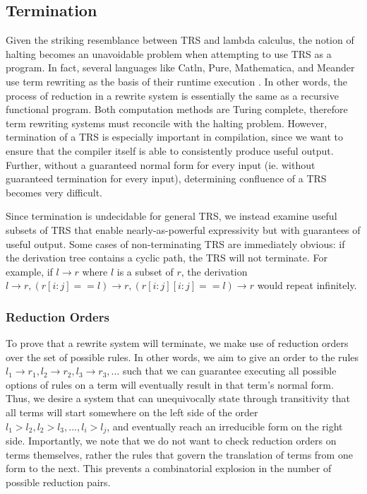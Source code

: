 \documentclass{article}
\begin{document}
\subsection{Termination}
Given the striking resemblance between TRS and lambda calculus,
the notion of halting becomes an unavoidable problem when attempting to use TRS as a program.
In fact, several languages like Catln, Pure, Mathematica, and Meander use term rewriting as the basis of their runtime execution \cite{catln,pure,mircea2004rule,meander}.
In other words, the process of reduction in a rewrite system is essentially the same as a recursive functional program.
Both computation methods are Turing complete, therefore term rewriting systems must reconcile with the halting problem.
However, termination of a TRS is especially important in compilation, since we want to ensure that the compiler itself
is able to consistently produce useful output.
Further, without a guaranteed normal form for every input (ie. without guaranteed termination for every input),
determining confluence of a TRS becomes very difficult.

Since termination is undecidable for general TRS, we instead examine useful subsets of TRS
that enable nearly-as-powerful expressivity but with guarantees of useful output.
Some cases of non-terminating TRS are immediately obvious: if the derivation tree contains a cyclic path,
the TRS will not terminate. For example, if $l \rightarrow r$ where $l$ is a subset of $r$, the derivation
$l \rightarrow r, (r[i:j] == l) \rightarrow r, (r[i:j][i:j] == l) \rightarrow r$ would repeat infinitely.

\subsubsection{Reduction Orders}
To prove that a rewrite system will terminate, we make use of reduction orders over the set of possible rules.
In other words, we aim to give an order to the rules $l_1 \rightarrow r_1,l_2 \rightarrow r_2,l_3 \rightarrow r_3,...$
such that we can guarantee executing all possible options of rules on a term will eventually result in that term's normal form.
Thus, we desire a system that can unequivocally state through transitivity that all terms will start somewhere on the left side of the order $l_1 > l_2, l_2 > l_3, ..., l_i > l_j$,
and eventually reach an irreducible form on the right side.
Importantly, we note that we do not want to check reduction orders on terms themselves, rather the rules that govern the translation of terms from one form to the next.
This prevents a combinatorial explosion in the number of possible reduction pairs.
\end{document}
